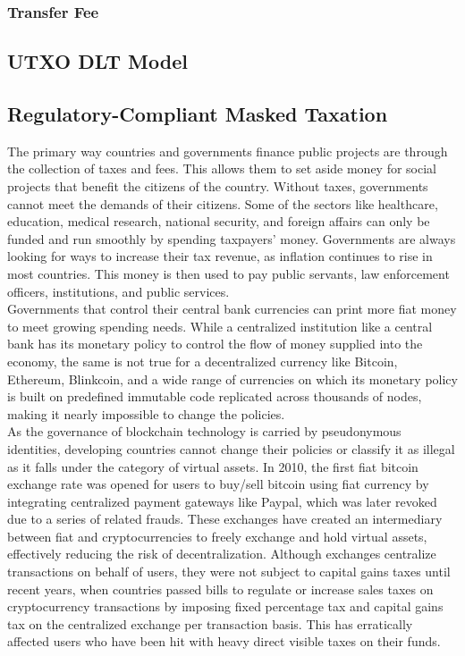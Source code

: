 \documentclass[letterpaper,11pt]{article}
\begin{document}
\subsubsection{Transfer Fee}
	
\subsection{UTXO DLT Model}



\subsection{Regulatory-Compliant Masked Taxation}

The primary way countries and governments finance public projects are through the collection of taxes and fees. This allows them to set aside money for social projects that benefit the citizens of the country. Without taxes, governments cannot meet the demands of their citizens. Some of the sectors like healthcare, education, medical research, national security, and foreign affairs can only be funded and run smoothly by spending taxpayers' money. Governments are always looking for ways to increase their tax revenue, as inflation continues to rise in most countries. This money is then used to pay public servants, law enforcement officers, institutions, and public services.\\

Governments that control their central bank currencies can print more fiat money to meet growing spending needs. While a centralized institution like a central bank has its monetary policy to control the flow of money supplied into the economy,  the same is not true for a decentralized currency like Bitcoin, Ethereum, Blinkcoin, and a wide range of currencies on which its monetary policy is built on predefined immutable code replicated across thousands of nodes, making it nearly impossible to change the policies.\\

As the governance of blockchain technology is carried by pseudonymous identities, developing countries cannot change their policies or classify it as illegal as it falls under the category of virtual assets. In 2010, the first fiat bitcoin exchange rate was opened for users to buy/sell bitcoin using fiat currency by integrating centralized payment gateways like Paypal, which was later revoked due to a series of related frauds. These exchanges have created an intermediary between fiat and cryptocurrencies to freely exchange and hold virtual assets, effectively reducing the risk of decentralization. Although exchanges centralize transactions on behalf of users, they were not subject to capital gains taxes until recent years, when countries passed bills to regulate or increase sales taxes on cryptocurrency transactions by imposing fixed percentage tax and capital gains tax on the centralized exchange per transaction basis. This has erratically affected users who have been hit with heavy direct visible taxes on their funds.\\
\end{document}
